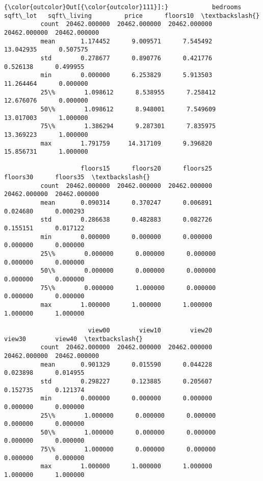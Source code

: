 \documentclass[11pt]{article}
\begin{document}
\begin{Verbatim}[commandchars=\\\{\}]
{\color{outcolor}Out[{\color{outcolor}111}]:}            bedrooms      sqft\_lot   sqft\_living         price      floors10  \textbackslash{}
          count  20462.000000  20462.000000  20462.000000  20462.000000  20462.000000   
          mean       1.174452      9.009571      7.545492     13.042935      0.507575   
          std        0.278677      0.890776      0.421776      0.526138      0.499955   
          min        0.000000      6.253829      5.913503     11.264464      0.000000   
          25\%        1.098612      8.538955      7.258412     12.676076      0.000000   
          50\%        1.098612      8.948001      7.549609     13.017003      1.000000   
          75\%        1.386294      9.287301      7.835975     13.369223      1.000000   
          max        1.791759     14.317109      9.396820     15.856731      1.000000   
          
                     floors15      floors20      floors25      floors30      floors35  \textbackslash{}
          count  20462.000000  20462.000000  20462.000000  20462.000000  20462.000000   
          mean       0.090314      0.370247      0.006891      0.024680      0.000293   
          std        0.286638      0.482883      0.082726      0.155151      0.017122   
          min        0.000000      0.000000      0.000000      0.000000      0.000000   
          25\%        0.000000      0.000000      0.000000      0.000000      0.000000   
          50\%        0.000000      0.000000      0.000000      0.000000      0.000000   
          75\%        0.000000      1.000000      0.000000      0.000000      0.000000   
          max        1.000000      1.000000      1.000000      1.000000      1.000000   
          
                       view00        view10        view20        view30        view40  \textbackslash{}
          count  20462.000000  20462.000000  20462.000000  20462.000000  20462.000000   
          mean       0.901329      0.015590      0.044228      0.023898      0.014955   
          std        0.298227      0.123885      0.205607      0.152735      0.121374   
          min        0.000000      0.000000      0.000000      0.000000      0.000000   
          25\%        1.000000      0.000000      0.000000      0.000000      0.000000   
          50\%        1.000000      0.000000      0.000000      0.000000      0.000000   
          75\%        1.000000      0.000000      0.000000      0.000000      0.000000   
          max        1.000000      1.000000      1.000000      1.000000      1.000000   
          

\end{Verbatim}
\end{document}
